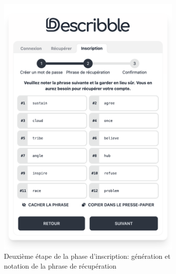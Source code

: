 \begin{figure}[H]
\begin{subfigure}[t]{0.45\textwidth}
        \includegraphics[width=\textwidth]{assets/figures/describble-register-2.png}
        \caption{Deuxième étape de la phase d'inscription: génération et notation de la phrase de récupération\label{fig:register2}}
    \end{subfigure}
    \hfill
    \begin{subfigure}[t]{0.45\textwidth}
        \centering

\end{subfigure}
\end{figure}
